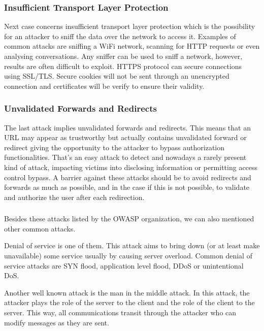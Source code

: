 \subsubsection{Insufficient Transport Layer Protection}
Next case concerns insufficient transport layer protection which is the
possibility for an attacker to sniff the data over the network to access it.
Examples of common attacks are sniffing a WiFi network, scanning for HTTP
requests or even analysing conversations. Any sniffer can be used to sniff a
network, however, results are often difficult to exploit. HTTPS protocol can
secure connections using SSL/TLS. Secure cookies will not be sent through an
unencrypted connection and certificates will be verify to ensure their
validity.

\subsubsection{Unvalidated Forwards and Redirects}
The last attack implies unvalidated forwards and redirects. This means that an
URL may appear as trustworthy but actually contains unvalidated forward or
redirect giving the opportunity to the attacker to bypass authorization
functionalities. That's an easy attack to detect and nowadays a rarely
present kind of attack, impacting victims  into disclosing information or
permitting access control bypass. A barrier against these attacks should be to
avoid redirects and forwards as much as possible, and in the case if this is
not possible, to validate and authorize the user after each redirection.


\subsubsection*{ }

Besides these attacks listed by the OWASP organization, we can also mentioned
other common attacks.

Denial of service is one of them. This attack aims to bring down (or at least
make unavailable) some service usually by causing server overload. Common
denial of service attacks are SYN flood, application level flood, DDoS or
unintentional DoS.

Another well known attack is the man in the middle attack. In this attack, the
attacker plays the role of the server to the client and the role of the client
to the server. This way, all communications transit through the attacker who
can modify messages as they are sent.

